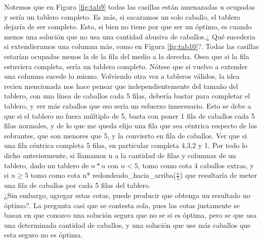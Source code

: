 

Notemos que en Figura \ref{fig:tab9} todas las casillas están amenazadas u ocupadas y sería un tablero completo. Es más, si sacaramos un solo caballo, el tablero dejaría de ser completo. Esto, si bien no tiene por que ser un óptimo, es cuando menos una solución que no usa una cantidad abusiva de caballos.¿ Qué sucederia si extendieramos una columna más, como en Figura \ref{fig:tab10}?. Todas las casillas estarían ocupadas menos la de la fila del medio a la derecha. Osea que si la fila estuviera completa, sería un tablero completo. Nótese que si vuelvo a extender una columna sucede lo mismo. Volviendo otra vez a tableros válidos, la idea recien mencionada nos hace pensar que independientemente del tamaño del tablero, con una línea de caballos cada 5 filas, debería bastar para completar el tablero, y ver más caballos que eso sería un esfuerzo innecesario. Esto se debe a que si el tablero no fuera múltiplo de 5, basta con poner 1 fila de caballos cada 5 filas normales, y de lo que me queda elijo una fila que sea céntrica respecto de las sobrantes, que son menores que 5, y la convierto en fila de caballos. Ver que si una fila céntrica completa 5 filas, en particular completa 4,3,2 y 1.
Por todo lo dicho anteriormente, si llamamos n a la cantidad de filas y columnas de un tablero, dado un tablero de $n*n$ con $n<5$, tomo como cota 4 caballos extras, y si $n\geq5$ tomo como cota n* redondeado_hacia_arriba($\frac{n}{5}$) que resultaría de meter una fila de caballos por cada 5 filas del tablero.\\
¿Sin embargo, agregar estas cotas, puede producir que obtenga un resultado no óptimo?. La pregunta casi que se contesta sola, pues las cotas justamente se basan en que conozco una solución segura que no se si es óptima, pero se que usa una determinada cantidad de caballos, y una solución que use más caballos que esta seguro no es óptima.

